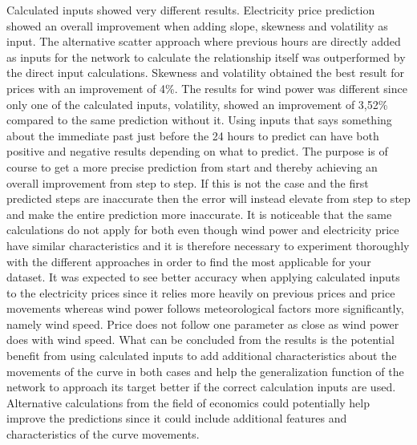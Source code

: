 Calculated inputs showed very different results. Electricity price prediction showed an overall improvement when adding slope, skewness and volatility as input. The alternative scatter approach where previous hours are directly added as inputs for the network to calculate the relationship itself was outperformed by the direct input calculations. Skewness and volatility obtained the best result for prices with an improvement of 4\%. The results for wind power was different since only one of the calculated inputs, volatility, showed an improvement of 3,52\% compared to the same prediction without it. Using inputs that says something about the immediate past just before the 24 hours to predict can have both positive and negative results depending on what to predict. The purpose is of course to get a more precise prediction from start and thereby achieving an overall improvement from step to step. If this is not the case and the first predicted steps are inaccurate then the error will instead elevate from step to step and make the entire prediction more inaccurate. It is noticeable that the same calculations do not apply for both even though wind power and electricity price have similar characteristics and it is therefore necessary to experiment thoroughly with the different approaches in order to find the most applicable for your dataset. It was expected to see better accuracy when applying calculated inputs to the electricity prices since it relies more heavily on previous prices and price movements whereas wind power follows meteorological factors more significantly, namely wind speed. Price does not follow one parameter as close as wind power does with wind speed. What can be concluded from the results is the potential benefit from using calculated inputs to add additional characteristics about the movements of the curve in both cases and help the generalization function of the network to approach its target better if the correct calculation inputs are used. Alternative calculations from the field of economics could potentially help improve the predictions since it could include additional features and characteristics of the curve movements. 
